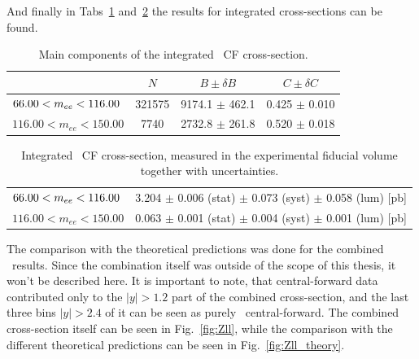 And finally in Tabs~\ref{tab:Zee_NBC} and~\ref{tab:Zee} the results for integrated cross-sections can be found.

\begin{table}
\centering
\begin{tabular}{lccc}
\hline
    &   $N$   & $B \pm \delta B$  &  $C \pm \delta C$ \\
\hline
$\hfill 66.00 < m_{ee} <116.00$       & 321575     & 9174.1     $\pm$ 462.1 & 0.425      $\pm$ 0.010 \\
$116.00 < m_{ee} <150.00$      & 7740       & 2732.8     $\pm$ 261.8 & 0.520      $\pm$ 0.018 \\
\hline
\end{tabular}
\caption{Main components of the integrated \Zee\ CF cross-section.}
\label{tab:Zee_NBC}
\end{table}

\begin{table}
\centering
\begin{tabular}{lc}
\hline
$\hfill 66.00 < m_{ee} <116.00$       & 3.204 $\pm$ 0.006 (stat) $\pm$ 0.073 (syst) $\pm$ 0.058 (lum) [pb]  \\
$116.00 < m_{ee} <150.00$      & 0.063 $\pm$ 0.001 (stat) $\pm$ 0.004 (syst) $\pm$ 0.001 (lum) [pb]  \\
\hline
\end{tabular}
\caption{Integrated \Zee\ CF cross-section, measured in the experimental fiducial volume together with uncertainties.}
\label{tab:Zee}
\end{table}

The comparison with the theoretical predictions was done for the combined \Zll\ results. Since the combination itself was outside of the scope of this thesis, it won't be described here. It is important to note, that \Zee central-forward data contributed only to the $|y| > 1.2$ part of the combined cross-section, and the last three bins $|y| > 2.4$ of it can be seen as purely \Zee\ central-forward. The combined cross-section itself can be seen in Fig.~\ref{fig:Zll}, while the comparison with the different theoretical predictions can be seen in Fig.~\ref{fig:Zll_theory}.

